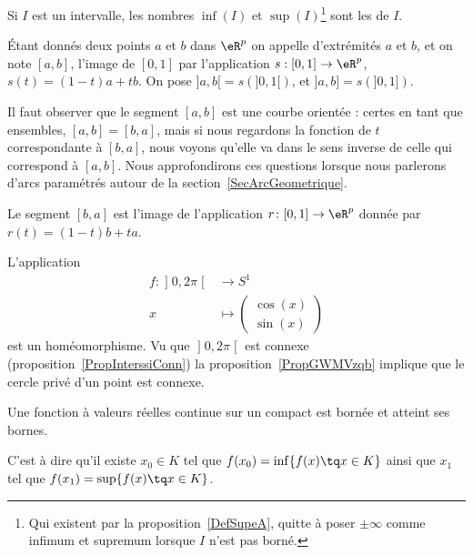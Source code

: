 Si \( I\) est un intervalle, les nombres \( \inf(I)\) et \( \sup(I)\)\footnote{Qui existent par la proposition~\ref{DefSupeA}, quitte à poser \( \pm\infty\) comme infimum et supremum lorsque \( I\) n'est pas borné.} sont les  de \( I\).

\begin{definition}      \label{DefLISOooDHLQrl}
	Étant donnés deux points $a$ et $b$ dans $\eR^p$ on appelle  d'extrémités $a$ et $b$, et on note $[a,b]$, l'image de $[0,1]$ par l'application $s: [0,1]\to \eR^p$, $s(t)= (1-t)a+tb$.  On pose $]a,b[=s\left(]0,1[\right)$, et  $]a,b]=s\left(]0,1]\right)$.
\end{definition}
Il faut observer que le segment $[a,b]$ est une courbe orientée : certes en tant que ensembles, $[a,b]=[b,a]$, mais si nous regardons la fonction de $t$ correspondante à $[b,a]$, nous voyons qu'elle va dans le sens inverse de celle qui correspond à $[a,b]$. Nous approfondirons ces questions lorsque nous parlerons d'arcs paramétrés autour de la section~\ref{SecArcGeometrique}.

Le segment $[b,a]$ est l'image de l'application $r\colon [0,1]\to \eR^p$ donnée par $r(t)=(1-t)b+ta$.

\begin{example} \label{EXooJFDPooBZADKs}
    L'application
    \begin{equation}
        \begin{aligned}
            f\colon \mathopen] 0 , 2\pi \mathclose[&\to S^1 \\
                x&\mapsto \begin{pmatrix}
                    \cos(x)    \\
                    \sin(x)
                \end{pmatrix}
        \end{aligned}
    \end{equation}
    est un homéomorphisme. Vu que \( \mathopen] 0 , 2\pi \mathclose[\) est connexe (proposition~\ref{PropInterssiConn}) la proposition~\ref{PropGWMVzqb} implique que le cercle privé d'un point est connexe.
\end{example}

\begin{theorem}\label{ThoMKKooAbHaro}
    Une fonction à valeurs réelles continue sur un compact est bornée et atteint ses bornes.

	C'est à dire qu'il existe $x_0\in K$ tel que $f(x_0)=\inf\{ f(x)\tq x\in K \}$ ainsi que $x_1$ tel que $f(x_1)=\sup\{ f(x)\tq x\in K \}$.
\end{theorem}

